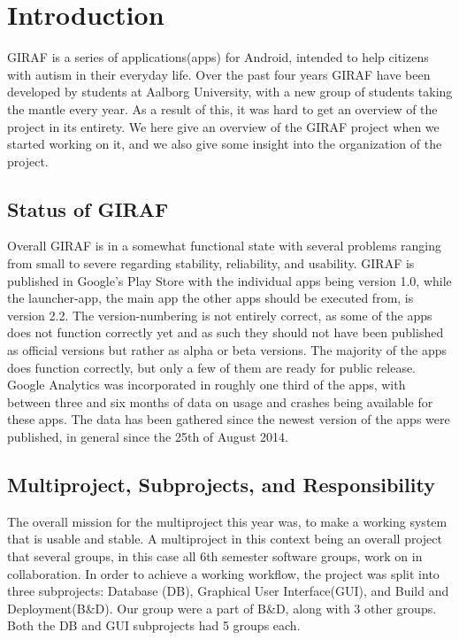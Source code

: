 \chapter{Introduction} \label{ChapIntroduction}
GIRAF is a series of applications(apps) for Android, intended to help citizens with autism in their everyday life. Over the past four years GIRAF have been developed by students at Aalborg University, with a new group of students taking the mantle every year. As a result of this, it was hard to get an overview of the project in its entirety. We here give an overview of the GIRAF project when we started working on it, and we also give some insight into the organization of the project.

\section{Status of GIRAF} %
Overall GIRAF is in a somewhat functional state with several problems ranging from small to severe regarding stability, reliability, and usability.
GIRAF is published in Google's Play Store with the individual apps being version 1.0, while the launcher-app, the main app the other apps should be executed from, is version 2.2. The version-numbering is not entirely correct, as some of the apps does not function correctly yet and as such they should not have been published as official versions but rather as alpha or beta versions. The majority of the apps does function correctly, but only a few of them are ready for public release.
Google Analytics was incorporated in roughly one third of the apps, with between three and six months of data on usage and crashes being available for these apps. The data has been gathered since the newest version of the apps were published, in general since the 25th of August 2014.

\section{Multiproject, Subprojects, and Responsibility}
The overall mission for the multiproject this year was, to make a working system that is usable and stable. A multiproject in this context being an overall project that several groups, in this case all 6th semester software groups, work on in collaboration. In order to achieve a working workflow, the project was split into three subprojects: Database (DB), Graphical User Interface(GUI), and Build and Deployment(B\&D). Our group were a part of B\&D, along with 3 other groups. Both the DB and GUI subprojects had 5 groups each.

